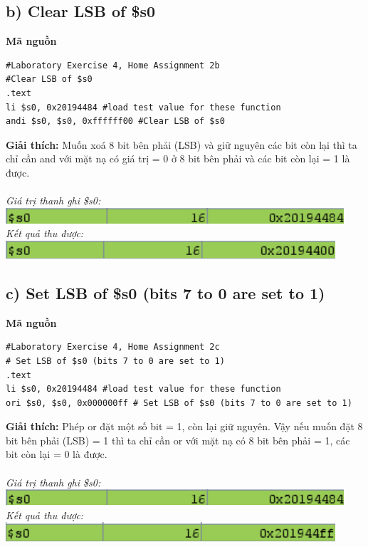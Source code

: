 \documentclass[12pt,a4paper,oneside]{article}
\begin{document}
\subsection*{b) Clear LSB of \$s0}
\textbf{Mã nguồn}
\begin{lstlisting}
#Laboratory Exercise 4, Home Assignment 2b
#Clear LSB of $s0
.text
li $s0, 0x20194484 #load test value for these function
andi $s0, $s0, 0xffffff00 #Clear LSB of $s0
\end{lstlisting}
\textbf{Giải thích:} Muốn xoá 8 bit bên phải (LSB) và giữ nguyên các bit còn lại thì ta chỉ cần and với mặt nạ có giá trị = 0 ở 8 bit bên phải và các bit còn lại = 1 là được.  \\\\
\textit{Giá trị thanh ghi \$s0: \quad \includegraphics[scale=1]{2.0}}\\
\textit{Kết quả thu được: \quad \quad \includegraphics[scale=1]{2.2}}

\subsection*{c) Set LSB of \$s0 (bits 7 to 0 are set to 1)}
\textbf{Mã nguồn}
\begin{lstlisting}
#Laboratory Exercise 4, Home Assignment 2c
# Set LSB of $s0 (bits 7 to 0 are set to 1)
.text
li $s0, 0x20194484 #load test value for these function
ori $s0, $s0, 0x000000ff # Set LSB of $s0 (bits 7 to 0 are set to 1)
\end{lstlisting}
\textbf{Giải thích:} Phép or đặt một số bit = 1, còn lại giữ nguyên. Vậy nếu muốn đặt 8 bit bên phải (LSB) = 1 thì ta chỉ cần or với mặt nạ có 8 bit bên phải = 1, các bit còn lại = 0 là được.  \\\\
\textit{Giá trị thanh ghi \$s0: \quad \includegraphics[scale=1]{2.0}}\\
\textit{Kết quả thu được: \quad \quad \includegraphics[scale=1]{2.3}}
\pagebreak
\end{document}
